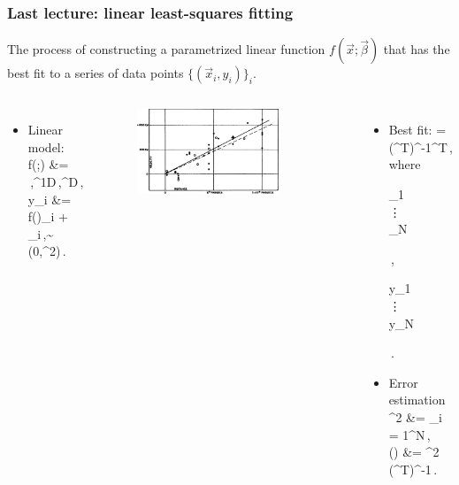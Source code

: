 \documentclass[10pt,aspectratio=169,handout]{beamer}
\begin{document}
\begin{frame}
	\frametitle{Last lecture: {\color{blue} linear} least-squares fitting}
	The process of constructing a parametrized {\color{blue}linear} function $f(\vec{x}; \vec{\beta})$ that has the best fit to a series of data points $\{(\vec{x}_i,y_i)\}_i$. \\ \pause
	
	\vspace{-0.5cm}
	\begin{columns}[t]
		\begin{itemize}[<+->]
		\item {\color{blue} Linear} model:
		\bea
		f(;\vec{\beta}) &= \vec{\beta}\,,\quad {}\in{}^{1\times D}\,,\vec{\beta}\in{}^{D}\,,\\
		y_i &= f()_i + \varepsilon_i\,,\quad \varepsilon\sim\ncal(0,\sigma^2)\,.
		\eea
		\end{itemize}
	\vspace{-0.3cm}
		\begin{figure}
			\centering
			\includegraphics[width=0.8\textwidth]{fig/hubble.jpg}
		\end{figure}%

		\begin{itemize}[<+->]
			
			\item Best fit:
			\bea
			\hat{\vec{\beta}} = (\mathbf{X}^T)^{-1}^T\,,
			\eea
			where
			\bea
			 \equiv \begin{bmatrix}
				_1 \\
				\vdots \\
				_N
			\end{bmatrix}\,,\quad 
			 \equiv  \begin{bmatrix}
				y_1\\
				\vdots \\
				y_N
			\end{bmatrix}\,.
			\eea
			
			\item Error estimation
			\bea
			\sigmahat^2 &= \sum_{i = 1}^N\,,\\
			(\hat{\vec{\beta}}) &= \sigmahat^2  (\mathbf{X}^T)^{-1}\,.
			\eea
		\end{itemize}
		\end{columns}

\end{frame}
\end{document}
